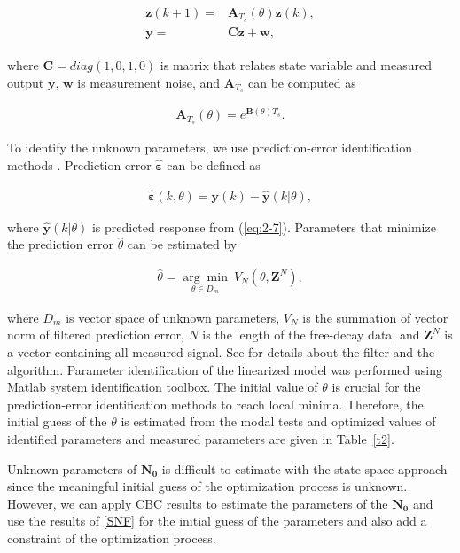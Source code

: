\documentclass[openacc]{rsproca_new}%
\def\epsilon{\varepsilon}
\def\vec#1{\ensuremath{\mathbf{#1}}}
\newcommand{\Eref}[1]{(\ref{#1})}
\newcommand{\Tref}[1]{Table~\ref{#1}}
\begin{document}
\begin{align}\label{eq:2-7}
  \begin{split}
\vec{z}(k+1)=&\vec{A}_{T_s}(\theta)\vec{z}(k),\\
\vec{y}=&\vec{C}\vec{z}+\vec{w},
\end{split}
\end{align}

\noindent where $\vec{C}=diag(1,0,1,0)$ is matrix that relates state variable and measured output $\vec{y}$, $\vec{w}$ is measurement noise, and $\vec{A}_{T_s}$ can be computed as

\begin{align}\label{eq:2-8}
\vec{A}_{T_s}(\theta)=e^{\vec{B}(\theta)T_s}.
\end{align}


\noindent To identify the unknown parameters, we use prediction-error identification methods \cite{ljung2001system}. Prediction error \vec{\hat \epsilon} can be defined as

\begin{align}\label{eq:2-9}
\vec{\hat \epsilon}(k,\theta)=\vec{y}(k)-\hat{\vec{y}}(k|\theta),
\end{align}

\noindent where $\hat{\vec{y}}(k|\theta)$ is predicted response from \Eref{eq:2-7}. Parameters that minimize the prediction error $\hat \theta$ can be estimated by

\begin{align}\label{eq:2-10}
\hat{\theta}=\underset{\theta \in D_m}{\arg\min} \: V_N(\theta,\vec{Z}^N),
\end{align}

\noindent where $D_m$ is vector space of unknown parameters, $V_N$ is the summation of vector norm of filtered prediction error, $N$ is the length of the free-decay data, and $\vec{Z}^N$ is a vector containing all measured signal. See \cite{ljung2001system} for details about the filter and the algorithm. Parameter identification of the linearized model was performed using Matlab system identification toolbox. The initial value of $\theta$ is crucial for the prediction-error identification methods to reach local minima. Therefore, the initial guess of the $\theta$ is estimated from the modal tests and optimized values of identified parameters and measured parameters are given in \Tref{t2}.

Unknown parameters of $\vec{N_0}$ is difficult to estimate with the state-space approach since the meaningful initial guess of the optimization process is unknown. However, we can apply CBC results to estimate the parameters of the $\vec{N_0}$ and use the results of
\ref{SNF} for the initial guess of the parameters and also add a constraint of the optimization process.
\end{document}

